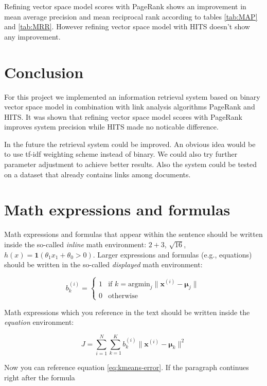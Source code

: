 \documentclass[10pt, a4paper]{article}
\begin{document}
Refining vector space model scores with PageRank shows an improvement in mean average precision and mean reciprocal rank according to tables \ref{tab:MAP} and \ref{tab:MRR}. However refining vector space model with HITS doesn't show any improvement.

\section{Conclusion}
For this project we implemented an information retrieval system based on binary vector space model in combination with link analysis algorithms PageRank and HITS. It was shown that refining vector space model scores with PageRank improves system precision while HITS made no noticable difference.

In the future the retrieval system could be improved. An obvious idea would be to use tf-idf weighting scheme instead of binary. We could also try further parameter adjustment to achieve better results. Also the system could be tested on a dataset that already contains links among documents.

\section{Math expressions and formulas}

Math expressions and formulas that appear within the sentence should be written inside the so-called \emph{inline} math environment: $2+3$, $\sqrt{16}$, $h(x)=\mathbf{1}(\theta_1 x_1 + \theta_0>0)$. Larger expressions and formulas (e.g., equations) should be written in the so-called \emph{displayed} math environment:

\[
b^{(i)}_k = \begin{cases}
1 & \text{if 
    $k = \text{argmin}_j \| \mathbf{x}^{(i)} - \mathbf{\mu}_j \|$}\\
0 & \text{otherwise}
\end{cases}
\]

Math expressions which you reference in the text should be written inside the \textit{equation} environment:

\begin{equation}\label{eq:kmeans-error}
J = \sum_{i=1}^N \sum_{k=1}^K 
b^{(i)}_k \| \mathbf{x}^{(i)} - \mathbf{\mu}_k \|^2
\end{equation}

Now you can reference equation \eqref{eq:kmeans-error}. If the paragraph continues right after the formula
\end{document}
